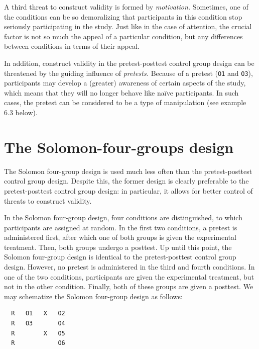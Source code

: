 \documentclass[
]{book}
\begin{document}
A third threat to construct validity is formed by \emph{motivation.} Sometimes, one of the conditions can be so demoralizing that participants in this condition stop seriously participating in the study. Just like in the case of attention, the crucial factor is not so much the appeal of a particular condition, but any differences between conditions in terms of their appeal.

In addition, construct validity in the pretest-posttest control group design can be threatened by the guiding influence of \emph{pretests.} Because of a pretest (\texttt{O1} and \texttt{O3}), participants may develop a (greater) awareness of certain aspects of the study, which means that they will no longer behave like naïve participants. In such cases, the pretest can be considered to be a type of manipulation (see example 6.3 below).

\section{The Solomon-four-groups design}\label{sec:solomon-four-groups-design}

The Solomon four-group design is used much less often than the pretest-posttest control group design. Despite this, the former design is clearly preferable to the pretest-posttest control group design: in particular, it allows for better control of threats to construct validity.

In the Solomon four-group design, four conditions are distinguished, to which participants are assigned at random. In the first two conditions, a pretest is administered first, after which one of both groups is given the experimental treatment. Then, both groups undergo a posttest. Up until this point, the Solomon four-group design is identical to the pretest-posttest control group design. However, no pretest is administered in the third and fourth conditions. In one of the two conditions, participants are given the experimental treatment, but not in the other condition. Finally, both of these groups are given a posttest. We may schematize the Solomon four-group design as follows:

\begin{verbatim}
  R   O1   X   O2
  R   O3       O4
  R        X   O5
  R            O6
\end{verbatim}
\end{document}
